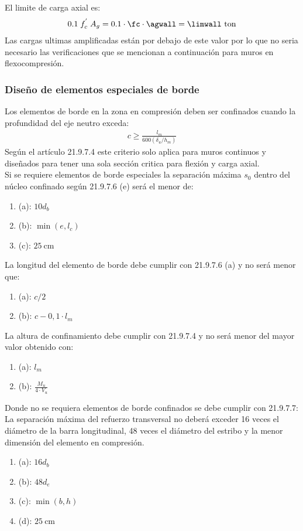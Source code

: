 \FPset{}
\noindent El limite de carga axial es:
\begin{align*}
0.1\;f_{c}^{'}\;A_{g}=0.1\cdot\fc\cdot\agwall=\limwall\mathrm{~ton}
\end{align*}
Las cargas ultimas amplificadas están por debajo de este valor por lo que no seria necesario las verificaciones que se mencionan a continuación para muros en flexocompresión.
\subsubsection{Diseño de elementos especiales de borde}
Los elementos de borde en la zona en compresión deben ser confinados cuando la profundidad del eje neutro exceda:
\begin{align}
c \geq \frac{l_{m}}{600\left(\delta_{u} / h_{m}\right)}  
\end{align}
\noindent
Según el artículo 21.9.7.4 este criterio solo aplica para muros continuos y diseñados para tener una sola sección critica para flexión y carga axial.\\
Si se requiere elementos de borde especiales la separación máxima $s_{0}$ dentro del núcleo confinado según 21.9.7.6 (e) será el menor de:
\begin{enumerate}
\item[] (a): $10 d_{b}$
\item[] (b): $\min \left(e, l_{c}\right)$
\item[] (c): $25 \mathrm{~cm}$
\end{enumerate}
\noindent
La longitud del elemento de borde debe cumplir con 21.9.7.6 (a) y no será menor que:
\begin{enumerate}
\item[] (a): $c/2$
\item[] (b): $c-0,1 \cdot l_{m}$
\end{enumerate}
La altura de confinamiento debe cumplir con 21.9.7.4 y no será menor del mayor valor obtenido con:
\begin{enumerate}
\item[] (a): $l_{m}$
\item[] (b): $ \displaystyle\frac{M_{u}}{4 \cdot V_{u}}$
\end{enumerate}
\noindent
Donde no se requiera elementos de borde confinados se debe cumplir con 21.9.7.7:\\
\noindent
La separación máxima del refuerzo transversal no deberá exceder 16 veces el diámetro de la barra longitudinal, 48 veces el diámetro del estribo y la menor dimensión del elemento en compresión.
\begin{enumerate}
\item[] (a): $16 d_{b}$
\item[] (b): $48 d_{e}$
\item[] (c): $\min (b, h)$
\item[] (d): $25 \mathrm{~cm}$
\end{enumerate}

